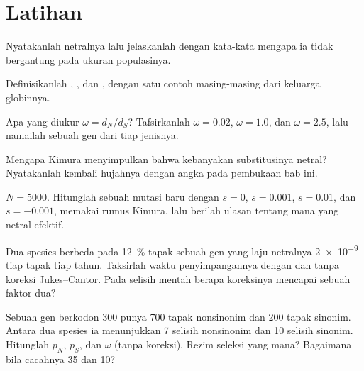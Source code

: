 \section{Latihan}

\begin{exercise}[$\star$]\label{exo:b3:molecular-evolution:1}
Nyatakanlah  netralnya lalu jelaskanlah dengan kata-kata mengapa ia tidak
bergantung pada ukuran populasinya.
\end{exercise}

\begin{exercise}[$\star$]\label{exo:b3:molecular-evolution:2}
Definisikanlah , , dan , dengan satu contoh masing-masing dari
keluarga globinnya.
\end{exercise}

\begin{exercise}[$\star$]\label{exo:b3:molecular-evolution:3}
Apa yang diukur $\omega = d_{N}/d_{S}$? Tafsirkanlah $\omega = 0.02$,
$\omega = 1.0$, dan $\omega = 2.5$, lalu namailah sebuah gen dari tiap jenisnya.
\end{exercise}

\begin{exercise}[$\star$]\label{exo:b3:molecular-evolution:4}
Mengapa Kimura menyimpulkan bahwa kebanyakan substitusinya netral? Nyatakanlah kembali
hujahnya dengan angka pada pembukaan bab ini.
\end{exercise}

\begin{exercise}[$\star\star$]\label{exo:b3:molecular-evolution:5}
$N = 5000$. Hitunglah  sebuah mutasi baru dengan $s
= 0$, $s = 0.001$, $s = 0.01$, dan $s = -0.001$, memakai rumus Kimura,
lalu berilah ulasan tentang mana yang netral efektif.
\end{exercise}

\begin{exercise}[$\star\star$]\label{exo:b3:molecular-evolution:6}
Dua spesies berbeda pada \qty{12}{\%} tapak sebuah gen yang laju
netralnya \qty{2e-9}{} tiap tapak tiap tahun. Taksirlah waktu penyimpangannya
dengan dan tanpa koreksi Jukes--Cantor. Pada selisih mentah berapa
koreksinya mencapai sebuah faktor dua?
\end{exercise}

\begin{exercise}[$\star\star$]\label{exo:b3:molecular-evolution:7}
Sebuah gen berkodon 300 punya 700 tapak nonsinonim dan 200 tapak sinonim.
Antara dua spesies ia menunjukkan 7 selisih nonsinonim dan 10 selisih sinonim.
Hitunglah $p_{N}$, $p_{S}$, dan $\omega$ (tanpa koreksi). Rezim
seleksi yang mana? Bagaimana bila cacahnya 35 dan 10?
\end{exercise}

